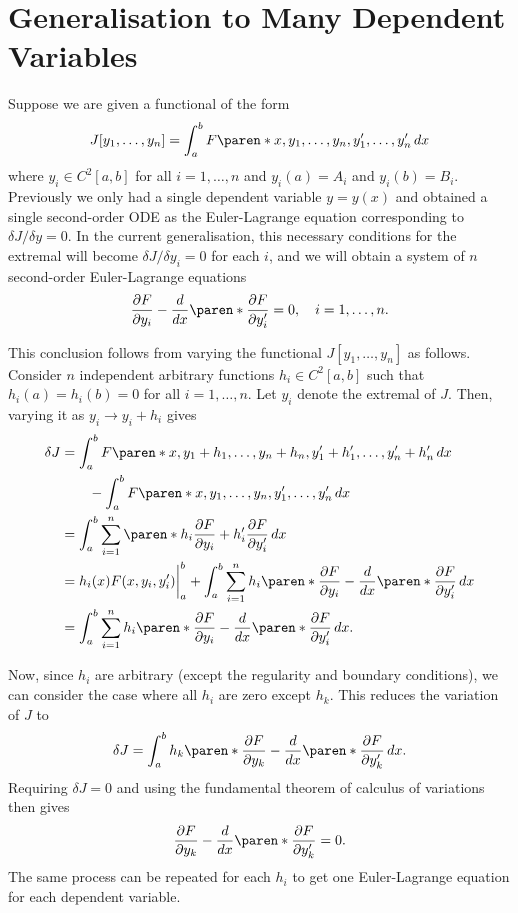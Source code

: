\documentclass[11pt]{penrose}
\begin{document}
\section{Generalisation to Many Dependent Variables}
Suppose we are given a functional of the form
\begin{equation}
    J[y_1, \dots, y_n] = \int_a^b F\paren*{x, y_1, \dots, y_n, y'_1, \dots, y'_n} \,dx
\end{equation}
where $y_i \in C^2 [a,b]$ for all $i=1, \dots, n$ and $y_i(a) = A_i$ and $y_i(b) = B_i$. Previously we only had a single dependent variable $y = y(x)$ and obtained a single second-order ODE as the Euler-Lagrange equation corresponding to $\delta J / \delta y = 0$. In the current generalisation, this necessary conditions for the extremal will become $\delta J / \delta y_i = 0$ for each $i$, and we will obtain a system of $n$ second-order Euler-Lagrange equations
\begin{equation}
    \frac{\pd F}{\pd y_i} - \frac{d}{dx} \paren*{\frac{\pd F}{\pd y'_i}} = 0,
    \quad i = 1, \dots, n.
\end{equation}

This conclusion follows from varying the functional $J[y_1, \dots, y_n]$ as follows. Consider $n$ independent arbitrary functions $h_i \in C^2[a,b]$ such that $h_i(a) = h_i(b) = 0$ for all $i = 1, \dots, n$. Let $y_i$ denote the extremal of $J$. Then, varying it as $y_i \to y_i + h_i$ gives
\begin{align}
    \delta J
    &= \int_a^b F\paren*{x, y_1 + h_1, \dots, y_n + h_n, y'_1 + h'_1, \dots, y'_n + h'_n} \,dx\\
    &\qquad - \int_a^b F\paren*{x, y_1, \dots, y_n, y'_1, \dots, y'_n} \,dx\\
    &= \int_a^b \sum_{i=1}^{n} \paren*{h_i \frac{\pd F}{\pd y_i} + h'_i \frac{\pd F}{\pd y'_i}} \,dx\\
    &= \bigg. h_i(x) F(x, y_i, y'_i) \bigg|_{a}^{b}
    + \int_a^b \sum_{i=1}^{n} h_i \paren*{ \frac{\pd F}{\pd y_i} - \frac{d}{dx} \paren*{\frac{\pd F}{\pd y'_i}}} \,dx\\
    &= \int_a^b \sum_{i=1}^{n} h_i \paren*{ \frac{\pd F}{\pd y_i} - \frac{d}{dx} \paren*{\frac{\pd F}{\pd y'_i}}} \,dx.
\end{align}

Now, since $h_i$ are arbitrary (except the regularity and boundary conditions), we can consider the case where all $h_i$ are zero except $h_k$. This reduces the variation of $J$ to
\begin{equation}
    \delta J = \int_a^b h_k \paren*{ \frac{\pd F}{\pd y_k} - \frac{d}{dx} \paren*{\frac{\pd F}{\pd y'_k}}} \,dx.
\end{equation}
Requiring $\delta J = 0$ and using the fundamental theorem of calculus of variations then gives
\begin{equation}
    \frac{\pd F}{\pd y_k} - \frac{d}{dx} \paren*{\frac{\pd F}{\pd y'_k}} = 0.
\end{equation}
The same process can be repeated for each $h_i$ to get one Euler-Lagrange equation for each dependent variable.
\end{document}
